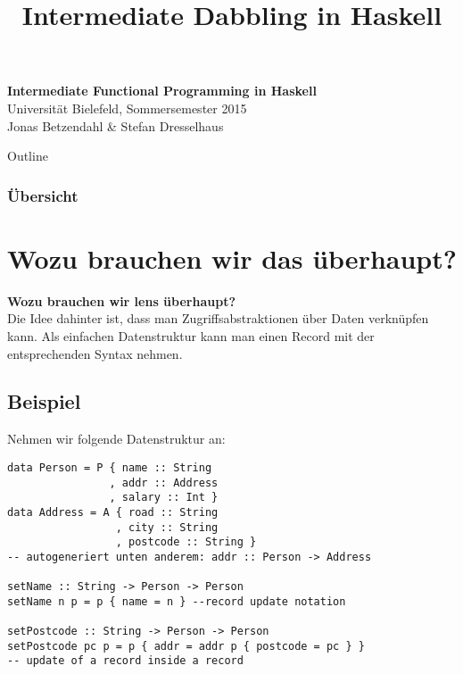 \documentclass{beamer}
\title{Intermediate Dabbling in Haskell}
\begin{document}
  

\begin{frame}
  \begin{center}
    \Huge\textbf{Intermediate Functional Programming in Haskell}\\ \bigskip
    \LARGE Universität Bielefeld, Sommersemester 2015\\ \bigskip
    \large Jonas Betzendahl \& Stefan Dresselhaus
    \end{center}
\end{frame}

\begin{frame}[allowframebreaks]{Outline}
\frametitle{Übersicht}
\tableofcontents[hideallsubsections]
\end{frame}

\section{Wozu brauchen wir das überhaupt?}

\begin{frame}[fragile]
\textbf{Wozu brauchen wir lens überhaupt?}\\
\bigskip
Die Idee dahinter ist, dass man Zugriffsabstraktionen über Daten
verknüpfen kann. Als einfachen Datenstruktur kann man einen Record mit
der entsprechenden Syntax nehmen.
\end{frame}

\subsection{Beispiel}

\begin{frame}[fragile]
Nehmen wir folgende Datenstruktur an:
\tiny
\begin{verbatim}
data Person = P { name :: String
                , addr :: Address
                , salary :: Int }
data Address = A { road :: String
                 , city :: String
                 , postcode :: String }
-- autogeneriert unten anderem: addr :: Person -> Address
    
setName :: String -> Person -> Person
setName n p = p { name = n } --record update notation
    
setPostcode :: String -> Person -> Person
setPostcode pc p = p { addr = addr p { postcode = pc } }
-- update of a record inside a record
\end{verbatim}
\normalsize
\end{frame}
\end{document}
